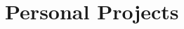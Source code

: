 \section{\textbf{Personal Projects}}
\resumeSubHeadingListStart




\resumeSubHeadingListEnd
\vspace{-5.5mm} 